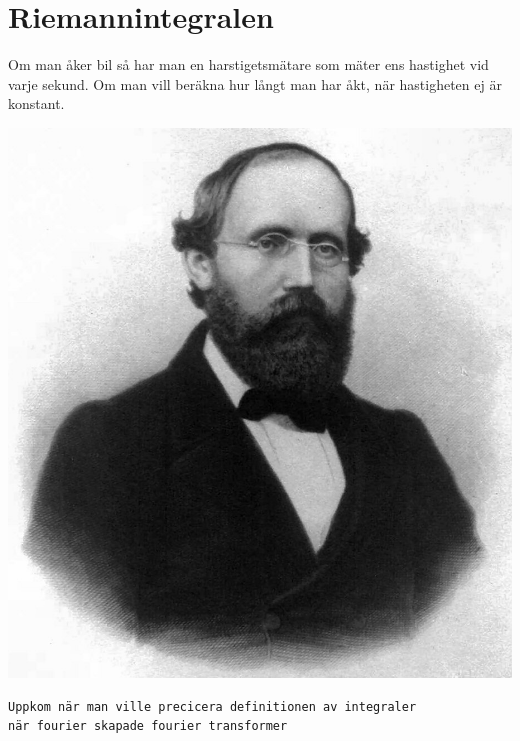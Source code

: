 \documentclass{article}
\begin{document}
\section{Riemannintegralen}
Om man åker bil så har man en harstigetsmätare som mäter ens hastighet vid varje sekund.
Om man vill beräkna hur långt man har åkt, när hastigheten ej är konstant.

\includegraphics[scale=0.3]{img/riemann.jpeg}
\begin{verbatim}
Uppkom när man ville precicera definitionen av integraler
när fourier skapade fourier transformer
\end{verbatim}
\end{document}
